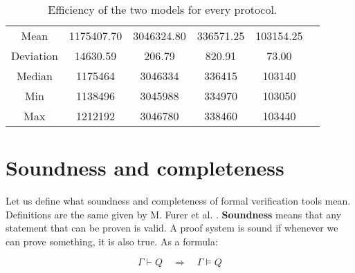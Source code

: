 \begin{table}[!ht]
{{\begin{tabular}{c|cc|cc|c}
                \multicolumn{1}{c|}{Mean}      & 1175407.70                                          & 3046324.80                              & 336571.25 & 103154.25 & \multicolumn{1}{l}{}                                                                                  \\ \cline{1-6}
                \multicolumn{1}{c|}{Deviation} & 14630.59                                            & 206.79                                  & 820.91    & 73.00     & \multicolumn{1}{l}{}                                                                                  \\ \cline{1-6}
                \multicolumn{1}{c|}{Median}    & 1175464                                             & 3046334                                 & 336415    & 103140    & \multicolumn{1}{l}{}                                                                                  \\ \cline{1-6}
                \multicolumn{1}{c|}{Min}       & 1138496                                             & 3045988                                 & 334970    & 103050    & \multicolumn{1}{l}{}                                                                                  \\ \cline{1-6}
                \multicolumn{1}{c|}{Max}       & 1212192                                             & 3046780                                 & 338460    & 103440    & \multicolumn{1}{l}{\parbox[t]{1em}{}}    \\
            \end{tabular}
        }
    }
    \caption{Efficiency of the two models for every protocol.}
    \label{tab:efficiency}
\end{table}


\section{Soundness and completeness}
Let us define what soundness and completeness of formal verification tools mean. Definitions are the same given by M. Furer et al. \cite{furer1989completeness}.
\textbf{Soundness} means that any statement that can be proven is valid. A proof system is sound if whenever we can prove something, it is also true. As a formula:

\begin{equation}
    \Gamma \vdash Q \quad \Longrightarrow \quad \Gamma \models Q
\end{equation}

